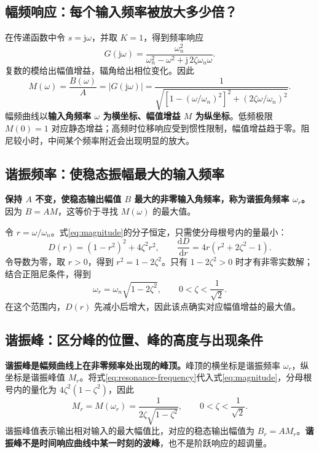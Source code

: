 \documentclass[UTF8,a4paper,11pt,fontset=windows]{ctexart}
\newcommand{\dd}{\mathrm{d}}
\begin{document}
\subsection{幅频响应：每个输入频率被放大多少倍？}
在传递函数中令 $s=\mathrm{j}\omega$，并取 $K=1$，得到频率响应
\[
  G(\mathrm{j}\omega)
  =\frac{\omega_n^2}{\omega_n^2-\omega^2+\mathrm{j}\,2\zeta\omega_n\omega}.
\]
复数的模给出幅值增益，辐角给出相位变化。因此
\begin{equation}\label{eq:magnitude}
  \boxed{M(\omega)=\frac{B(\omega)}{A}=|G(\mathrm{j}\omega)|
  =\frac{1}{\sqrt{\left[1-(\omega/\omega_n)^2\right]^2
  +\left(2\zeta\omega/\omega_n\right)^2}}.}
\end{equation}
幅频曲线以\textbf{输入角频率 $\omega$ 为横坐标、幅值增益 $M$ 为纵坐标}。低频极限 $M(0)=1$ 对应静态增益；高频时位移响应受到惯性限制，幅值增益趋于零。阻尼较小时，中间某个频率附近会出现明显的放大。

\subsection{谐振频率：使稳态振幅最大的输入频率}
\textbf{保持 $A$ 不变，使稳态输出幅值 $B$ 最大的非零输入角频率，称为谐振角频率 $\omega_r$。}因为 $B=AM$，这等价于寻找 $M(\omega)$ 的最大值。

令 $r=\omega/\omega_n$。式\eqref{eq:magnitude}的分子恒定，只需使分母根号内的量最小：
\[
  D(r)=(1-r^2)^2+4\zeta^2r^2,
  \qquad
  \frac{\dd D}{\dd r}=4r(r^2+2\zeta^2-1).
\]
令导数为零，取 $r>0$，得到 $r^2=1-2\zeta^2$。只有 $1-2\zeta^2>0$ 时才有非零实数解；结合正阻尼条件，得到
\begin{equation}\label{eq:resonance-frequency}
  \boxed{\omega_r=\omega_n\sqrt{1-2\zeta^2}},
  \qquad
  \boxed{0<\zeta<\frac{1}{\sqrt2}}.
\end{equation}
在这个范围内，$D(r)$ 先减小后增大，因此该点确实对应幅值增益的最大值。

\newpage
\subsection{谐振峰：区分峰的位置、峰的高度与出现条件}
\textbf{谐振峰是幅频曲线上在非零频率处出现的峰顶。}峰顶的横坐标是谐振频率 $\omega_r$，纵坐标是谐振峰值 $M_r$。将式\eqref{eq:resonance-frequency}代入式\eqref{eq:magnitude}，分母根号内的量化为 $4\zeta^2(1-\zeta^2)$，因此
\begin{equation}\label{eq:resonance-peak}
  \boxed{M_r=M(\omega_r)=\frac{1}{2\zeta\sqrt{1-\zeta^2}}},
  \qquad 0<\zeta<\frac{1}{\sqrt2}.
\end{equation}
谐振峰值表示输出相对输入的最大幅值比，对应的稳态输出幅值为 $B_r=AM_r$。\textbf{谐振峰不是时间响应曲线中某一时刻的波峰}，也不是阶跃响应的超调量。
\end{document}
